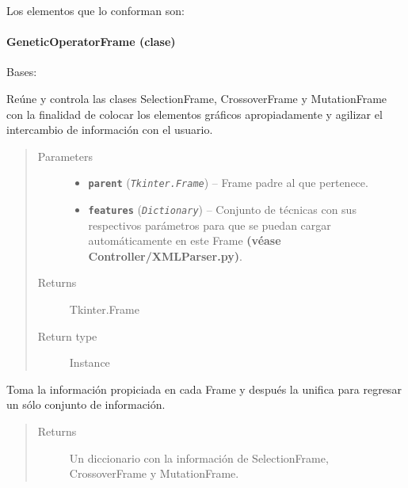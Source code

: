 \documentclass[letterpaper,10pt,english]{sphinxmanual}
\begin{document}
Los elementos que lo conforman son:


\paragraph{GeneticOperatorFrame (clase)}
\label{View/Main/GeneticOperator/GeneticOperatorFrame:geneticoperatorframe-clase}\label{View/Main/GeneticOperator/GeneticOperatorFrame::doc}\label{View/Main/GeneticOperator/GeneticOperatorFrame:module-View.Main.GeneticOperator.GeneticOperatorFrame}

\begin{fulllineitems}
\label{View/Main/GeneticOperator/GeneticOperatorFrame:View.Main.GeneticOperator.GeneticOperatorFrame.GeneticOperatorFrame}
Bases: 

Reúne y controla las clases SelectionFrame, CrossoverFrame y  
MutationFrame con la finalidad de colocar los elementos gráficos apropiadamente y 
agilizar el intercambio de información con el usuario.
\begin{quote}\begin{description}
\item[{Parameters}] \leavevmode\begin{itemize}
\item {} 
\textbf{\texttt{parent}} (\emph{\texttt{Tkinter.Frame}}) -- Frame padre al que pertenece.

\item {} 
\textbf{\texttt{features}} (\emph{\texttt{Dictionary}}) -- Conjunto de técnicas con sus respectivos parámetros para que
se puedan cargar automáticamente en este Frame \textbf{(véase
Controller/XMLParser.py)}.

\end{itemize}

\item[{Returns}] \leavevmode
Tkinter.Frame

\item[{Return type}] \leavevmode
Instance

\end{description}\end{quote}

\begin{fulllineitems}
\label{View/Main/GeneticOperator/GeneticOperatorFrame:View.Main.GeneticOperator.GeneticOperatorFrame.GeneticOperatorFrame.get_information}
Toma la información propiciada en cada Frame y después
la unifica para regresar un sólo conjunto de información.
\begin{quote}\begin{description}
\item[{Returns}] \leavevmode
Un diccionario con la información de SelectionFrame, CrossoverFrame y MutationFrame.


\end{description}
\end{quote}
\end{fulllineitems}
\end{fulllineitems}
\end{document}
